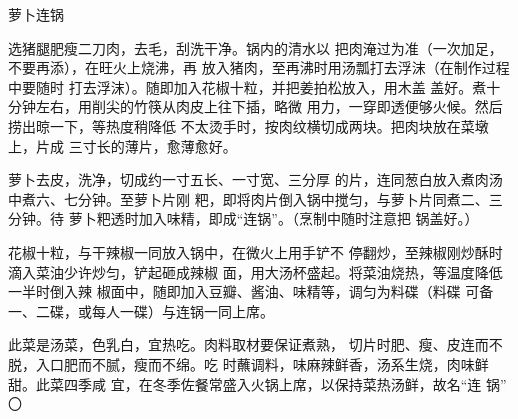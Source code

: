 \begin{recipe}{萝卜连锅}

\ingredients




\cooking

\step 选猪腿肥瘦二刀肉，去毛，刮洗干净。锅内的清水以 把肉淹过为准（一次加足，不要再添），在旺火上烧沸，再 放入猪肉，至再沸时用汤瓢打去浮沫（在制作过程中要随时 打去浮沫）。随即加入花椒十粒，并把姜拍松放入，用木盖 盖好。煮十分钟左右，用削尖的竹筷从肉皮上往下插，略微 用力，一穿即透便够火候。然后捞出晾一下，等热度稍降低 不太烫手时，按肉纹横切成两块。把肉块放在菜墩上，片成 三寸长的薄片，愈薄愈好。

\step 萝卜去皮，洗净，切成约一寸五长、一寸宽、三分厚 的片，连同葱白放入煮肉汤中煮六、七分钟。至萝卜片刚 粑，即将肉片倒入锅中搅匀，与萝卜片同煮二、三分钟。待 萝卜粑透时加入味精，即成“连锅”。（烹制中随时注意把 锅盖好。）

\step 花椒十粒，与干辣椒一同放入锅中，在微火上用手铲不 停翻炒，至辣椒刚炒酥时滴入菜油少许炒匀，铲起砸成辣椒 面，用大汤杯盛起。将菜油烧热，等温度降低一半时倒入辣 椒面中，随即加入豆瓣、酱油、味精等，调匀为料碟（料碟 可备一、二碟，或每人一碟）与连锅一同上席。

\notes

此菜是汤菜，色乳白，宜热吃。肉料取材要保证煮熟， 切片时肥、瘦、皮连而不脱，入口肥而不腻，瘦而不绵。吃 时蘸调料，味麻辣鲜香，汤系生烧，肉味鲜甜。此菜四季咸 宜，在冬季佐餐常盛入火锅上席，以保持菜热汤鲜，故名“连 锅” 〇

\end{recipe}

